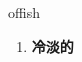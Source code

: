 
\begin{frame}
{\huge offish}
\begin{center}
\begin{enumerate}\Large
  \item \textbf{冷淡的}
\end{enumerate}
\end{center}
\end{frame}

